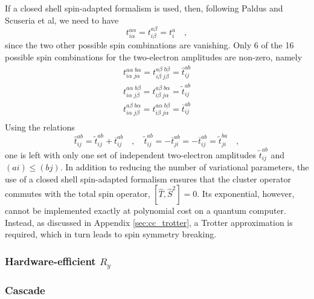 \documentclass[aps,pra,onecolumn]{revtex4-2}
\begin{document}
If a closed shell spin-adapted formalism is used, then, following Paldus and Scuseria et al, we need to have
\begin{equation}
t^{a \alpha}_{i \alpha} = t^{a \beta}_{i \beta} = t^a_i \quad,
\end{equation}
since the two other possible spin combinations are vanishing. 
Only 6 of the 16 possible spin combinations for the two-electron amplitudes are non-zero, namely
\begin{equation}
\begin{split}
t^{a \alpha \; b \alpha}_{i \alpha \; j \alpha} = t^{a \beta \; b \beta}_{i \beta\; j\beta} = \hat{t}^{ab}_{ij} \\
t^{a \alpha \; b \beta}_{i \alpha \; j \beta} = t^{a \beta \; b \alpha}_{i \beta\; j\alpha} = \tilde{t}^{ab}_{ij} \\
t^{a \beta \; b \alpha}_{i \alpha \; j \beta} = t^{a \alpha \; b \beta}_{i \beta\; j\alpha} = \overline{t}^{ab}_{ij} \\
\end{split}
\end{equation}
Using the relations
\begin{equation}
\hat{t}^{ab}_{ij} = \tilde{t}^{ab}_{ij} + \overline{t}^{ab}_{ij}
\quad,\quad
\tilde{t}^{ab}_{ij} = - \overline{t}^{ab}_{ji} = - \overline{t}^{ab}_{ij} = \tilde{t}^{ba}_{ji}
\quad,
\end{equation}
one is left with only one set of independent two-electron amplitudes $\tilde{t}^{ab}_{ij}$ and $(ai) \leq (bj)$. In addition to reducing the 
number of variational parameters, the use of a closed shell spin-adapted formalism ensures that the cluster operator commutes with 
the total spin operator, $[ \hat{T} , \hat{S}^2 ] = 0$.
Its exponential, however, cannot be implemented exactly at polynomial cost on a quantum computer. 
Instead, as discussed in Appendix \ref{sec:cc_trotter}, a Trotter approximation is required, which in turn leads to spin symmetry breaking.

\subsubsection{Hardware-efficient $R_y$}

\subsubsection{Cascade}

\end{document}
